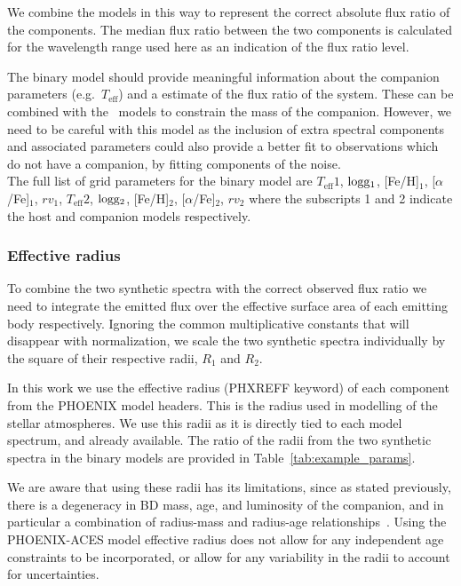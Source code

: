\documentclass[fleqn,usenatbib]{mnras}
\begin{document}
We combine the models in this way to represent the correct absolute flux ratio of the components. The median flux ratio between the two components is calculated for the wavelength range used here as an indication of the flux ratio level.

The binary model should provide meaningful information about the companion parameters (e.g.\ \(T_{\textrm{eff}}\)) and a estimate of the flux ratio of the system. These can be combined with the~\citet{baraffe_evolutionary_2003} models to constrain the mass of the companion. However, we need to be careful with this model as the inclusion of extra spectral components and associated parameters could also provide a better fit to observations which do not have a companion, by fitting components of the noise.\\

{The full list of grid parameters for the binary model are \(T_{\textrm{eff}}1\),  \(\rm logg_1\), [Fe/H]$_1$, [\(\alpha\)/Fe]$_1$, ${rv}_1$, \(T_{\textrm{eff}}2\), \(\rm logg_2\), [Fe/H]$_2$, [\(\alpha\)/Fe]$_2$, ${rv}_2$ where the subscripts 1 and 2 indicate the host and companion models respectively.}

\subsubsection{Effective radius}
\label{subsection-radius}
To combine the two synthetic spectra with the correct observed flux ratio we need to integrate the emitted flux over the effective surface area of each emitting body respectively. Ignoring the common multiplicative constants that will disappear with normalization, we scale the two synthetic spectra individually by the square of their respective radii, \(R_1\) and \(R_2\).

In this work we use the effective radius (PHXREFF keyword) of each component from the PHOENIX model headers. This is the radius used in modelling of the stellar atmospheres. We use this radii as it is directly tied to each model spectrum, and already available. The ratio of the radii from the two synthetic spectra in the binary models are provided in Table~\ref{tab:example_params}.

We are aware that using these radii has its limitations, since as stated previously, there is a degeneracy in BD mass, age, and luminosity of the companion, and in particular a combination of radius-mass and radius-age relationships~\citep{sorahana_radii_2013}. Using the PHOENIX-ACES model effective radius does not allow for any independent age constraints to be incorporated, or allow for any variability in the radii to account for uncertainties.
\end{document}
